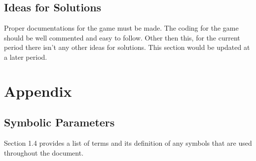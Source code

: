 \documentclass[12pt,letterpaper]{article}
\begin{document}
\subsection{Ideas for Solutions}
Proper documentations for the game must be made. The coding for the game should be well commented and easy to follow. Other then this, for the current period there isn’t any other ideas for solutions. This section would be updated at a later period. 
\section{Appendix}
\subsection{Symbolic Parameters}
Section 1.4 provides a list of terms and its definition of any symbols that are used throughout the document.
\end{document}
